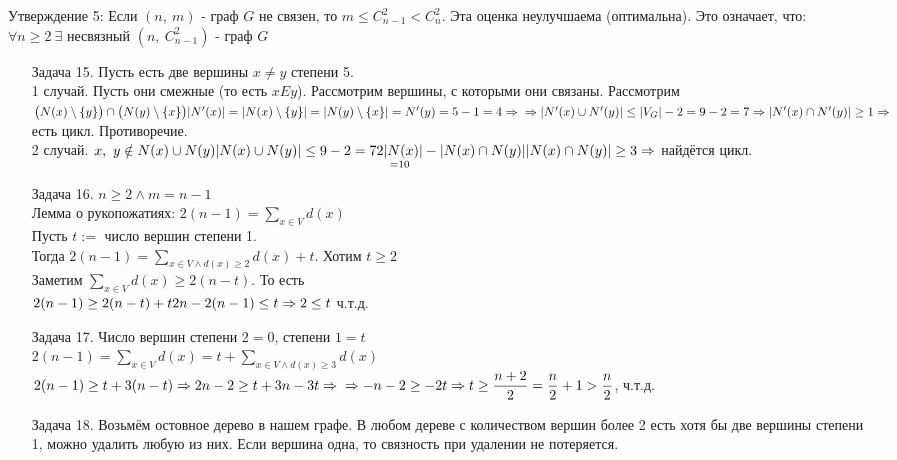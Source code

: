 \documentclass[12pt, letterpaper, twoside]{article}
\begin{document}
    Утверждение 5: Если $(n,\ m)$ - граф $G$ не связен, то $m \leq C^2_{n - 1} < C^2_n$. Эта оценка неулучшаема (оптимальна). Это означает, что:\\
    $\forall n \geq 2\ \exists$ несвязный $(n,\ C^2_{n - 1})$ - граф $G$
    \begin{enumerate}
        \item[Задача 15.] Пусть есть две вершины $x \neq y$ степени 5.\\
        1 случай. Пусть они смежные (то есть $xEy$). Рассмотрим вершины, с которыми они связаны. Рассмотрим $\big(N(x)\setminus \{y\}\big) \cap \big( N(y) \setminus \{x\}\big)\\
        |N'(x)| = |N(x)\setminus \{y\}| = |N(y)\setminus \{x\}| = N'(y) = 5 - 1 = 4\Rightarrow\\
        \Rightarrow |N'(x) \cup N'(y)| \leq |V_G| - 2 = 9 - 2 = 7\Rightarrow |N'(x) \cap N'(y)|\geq 1\Rightarrow$ есть цикл. Противоречие.\\
        2 случай. $x,\ y \notin N(x) \cup N(y)\\
        |N(x) \cup N(y)| \leq 9 - 2=  7\\
        \underset{=10}{2|N(x)|} - |N(x)\cap N(y)|\\
        |N(x)\cap N(y)| \geq 3\Rightarrow$ найдётся цикл.
        \item[Задача 16.] $n\geq 2 \wedge m = n - 1$\\
        Лемма о рукопожатиях: $2(n - 1) = \displaystyle \sum_{x \in V} d(x)$\\
        Пусть $t :=$ число вершин степени 1.\\
        Тогда $2(n - 1) = \displaystyle \sum_{x\in V \wedge d(x) \geq 2} d(x) + t$. Хотим $t \geq 2$\\
        Заметим $\displaystyle \sum_{x\in V} d(x) \geq 2(n - t)$. То есть\\
        $2(n - 1) \geq 2(n - t) + t\\
        2n - 2(n - 1) \leq t\Rightarrow 2 \leq t$ ч.т.д.
        \item[Задача 17.] Число вершин степени $2 = 0$, степени $1 = t$\\
        $2(n - 1) = \displaystyle\sum_{x \in V} d(x) = t + \sum_{x \in V\wedge d(x) \geq 3}d(x)$\\
        $2(n - 1) \geq t + 3(n - t)\Rightarrow 2n - 2 \geq t + 3n - 3t\Rightarrow \\
        \Rightarrow -n - 2 \geq -2t\Rightarrow t \geq \dfrac{n + 2}{2} = \dfrac{n}{2} + 1 > \dfrac{n}{2}$, ч.т.д.
        \item[Задача 18.] Возьмём остовное дерево в нашем графе. В любом дереве с количеством вершин более 2 есть хотя бы две вершины степени 1, можно удалить любую из них. Если вершина одна, то связность при удалении не потеряется.
    \end{enumerate}
\end{document}
